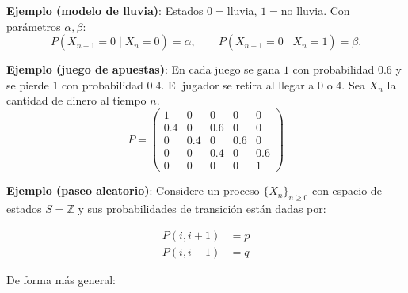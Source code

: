 \documentclass[12pt,a4paper]{article}
\begin{document}
\textbf{Ejemplo (modelo de lluvia)}:
Estados $0=$lluvia, $1=$no lluvia. Con parámetros $\alpha,\beta$:
\begin{equation*}
P(X_{n+1}=0 \mid X_n=0)=\alpha, \qquad
P(X_{n+1}=0 \mid X_n=1)=\beta.
\end{equation*}

\textbf{Ejemplo (juego de apuestas)}: En cada juego se gana $1$ con probabilidad $0.6$ y se pierde $1$ con probabilidad $0.4$.
El jugador se retira al llegar a $0$ o $4$. Sea $X_n$ la cantidad de dinero al tiempo $n$.
\begin{equation*}
P=
\begin{pmatrix}
1 & 0 & 0 & 0 & 0\\
0.4 & 0 & 0.6 & 0 & 0\\
0 & 0.4 & 0 & 0.6 & 0\\
0 & 0 & 0.4 & 0 & 0.6\\
0 & 0 & 0 & 0 & 1
\end{pmatrix}
\end{equation*}
\begin{center}
\end{center}

\textbf{Ejemplo (paseo aleatorio)}: Considere un proceso $\{X_n\}_{n\ge 0}$ con espacio de estados $S=\mathbb{Z}$ y sus probabilidades de transición están dadas por:

\begin{align*}
    P(i,i+1) &= p \\
    P(i,i-1) &= q
\end{align*}

De forma más general:
\end{document}

